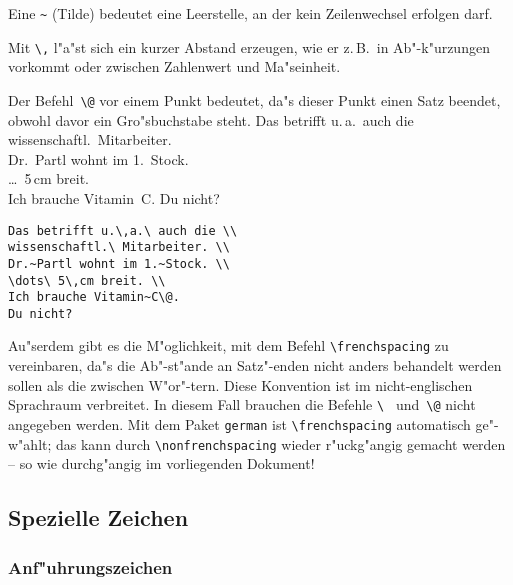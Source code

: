 Eine \verb|~| (Tilde) bedeutet eine Leerstelle,
an der
kein Zeilenwechsel erfolgen darf.

Mit \verb|\,| l"a"st sich ein kurzer Abstand erzeugen, wie er
z.\,B.\ in Ab"-k"urzungen vorkommt oder zwischen Zahlenwert und Ma"seinheit.

Der Befehl~\verb|\@| vor einem Punkt bedeutet, da"s dieser Punkt
einen Satz beendet, obwohl davor ein Gro"sbuchstabe steht.
\exa
Das betrifft u.\,a.\ auch die \\
wissenschaftl.\ Mitarbeiter. \\
Dr.~Partl wohnt im 1.~Stock. \\
\dots\ 5\,cm breit. \\
Ich brauche Vitamin~C\@. Du nicht?
\exb
\begin{verbatim}
Das betrifft u.\,a.\ auch die \\
wissenschaftl.\ Mitarbeiter. \\
Dr.~Partl wohnt im 1.~Stock. \\
\dots\ 5\,cm breit. \\
Ich brauche Vitamin~C\@.
Du nicht?
\end{verbatim}
\exc
 
Au"serdem gibt es die M"oglichkeit, mit dem Befehl
\verb|\frenchspacing|
zu vereinbaren, da"s die Ab"-st"ande an Satz"-enden nicht anders
behandelt werden sollen als die zwischen W"or"-tern.
Diese Konvention ist im nicht-englischen Sprachraum verbreitet.
In diesem Fall brauchen die Befehle \verb|\ | und~\verb|\@| nicht
angegeben werden.
Mit dem Paket \texttt{german} ist \verb:\frenchspacing:
automatisch ge"-w"ahlt; das kann durch
\verb:\nonfrenchspacing:
wieder r"uckg"angig gemacht werden -- so wie durchg"angig im vorliegenden
Dokument!

 

\subsection{Spezielle Zeichen} \label{spezial}
 
\subsubsection{Anf"uhrungszeichen} \label{quotes}
 
